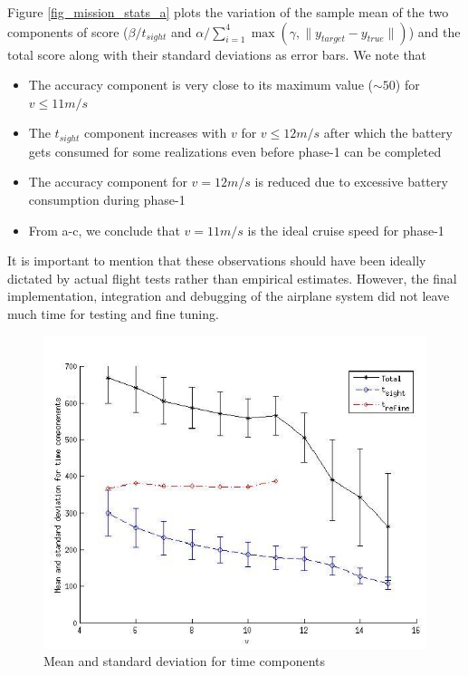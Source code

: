 Figure \ref{fig_mission_stats_a} plots the variation of the sample mean of the two components of score ($\beta/t_{sight}$ and $\alpha/ \sum_{i=1}^4 \max(\gamma, \|y_{target} - y_{true} \|)$) and the total score along with their standard deviations as error bars. We note that

\begin{itemize}
\item The accuracy component is very close to its maximum value ($\sim 50$) for $v\leq 11m/s$
\item The $t_{sight}$ component increases with $v$ for $v \leq 12 m/s$ after which the battery gets consumed for some realizations even before phase-1 can be completed
\item The accuracy component for $v=12 m/s$ is reduced due to excessive battery consumption during phase-1
\item From a-c, we conclude that $v = 11m/s$ is the ideal cruise speed for phase-1
\end{itemize}

It is important to mention that these observations should have been ideally dictated by actual flight tests rather than empirical estimates. However, the final implementation, integration and debugging of the airplane system did not leave much time for testing and fine tuning.

\begin{figure}
\centering
\includegraphics[scale=0.75]{Figures/mission_stats_b}
\caption{Mean and standard deviation for time components}
\label{fig_mission_stats_b}
\end{figure}

